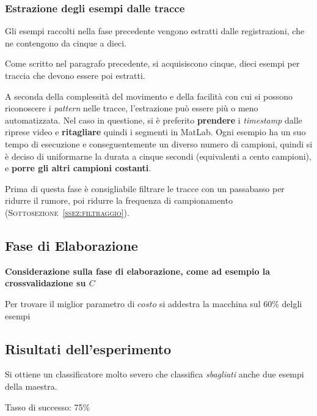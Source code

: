 \subsubsection{Estrazione degli esempi dalle tracce}
Gli esempi raccolti nella fase precedente vengono estratti dalle registrazioni,
che ne contengono da cinque a dieci.

Come scritto nel paragrafo precedente,
si acquisiscono cinque, dieci esempi per traccia
che devono essere poi estratti.

A seconda della complessità del movimento e
della facilità con cui si possono riconoscere i \textit{pattern} nelle tracce,
l'estrazione può essere più o meno automatizzata.
Nel caso in questione, si è preferito \textbf{prendere} i \textit{timestamp}
dalle riprese video e \textbf{ritagliare} quindi i segmenti in MatLab.
Ogni esempio ha un suo tempo di esecuzione e
conseguentemente un diverso numero di campioni,
quindi si è deciso di uniformarne la durata a cinque secondi
(equivalenti a cento campioni),
e \textbf{porre gli altri campioni costanti}.

Prima di questa fase è consigliabile filtrare le tracce con un passabasso per ridurre il rumore,
poi ridurre la frequenza di campionamento (\textsc{Sottosezione~\ref{ssez:filtraggio}}).







\subsection{Fase di Elaborazione}

{\bfseries Considerazione sulla fase di elaborazione,
come ad esempio la crossvalidazione su $C$}

Per trovare il miglior parametro di $costo$
si addestra la macchina sul 60\% delgli esempi




\subsection{Risultati dell'esperimento}

  Si ottiene un classificatore molto severo
  che classifica \emph{sbagliati} anche due esempi della maestra.
\begin{center}
	Tasso di successo:  75\%
\end{center}
  
